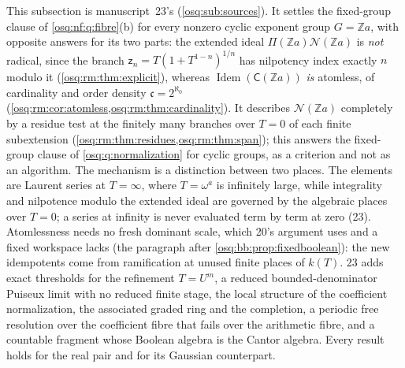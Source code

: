 \documentclass[11pt,letterpaper]{article}
\numberwithin{equation}{section}
\theoremstyle{definition}
\theoremstyle{remark}
\theoremstyle{plain}
\newcommand{\Z}{\mathbb Z}
\newcommand{\NN}{\mathcal N}         %
\newcommand{\Idem}{\operatorname{Idem}}
\begin{document}
This subsection is manuscript~23's (\cref{osq:sub:sources}). It settles the fixed-group clause of \cref{osq:nf:q:fibre}(b) for every nonzero
cyclic exponent group $G=\Z a$, with opposite answers for its two parts: the extended ideal $\Pi(\Z a)\NN(\Z a)$ is \emph{not} radical, since
the branch $\mathsf z_n=T(1+T^{1-n})^{1/n}$ has nilpotency index exactly $n$ modulo it (\cref{osq:rm:thm:explicit}), whereas $\Idem(\mathsf C(\Z a))$
\emph{is} atomless, of cardinality and order density $\mathfrak c=2^{\aleph_0}$ (\cref{osq:rm:cor:atomless,osq:rm:thm:cardinality}). It describes
$\NN(\Z a)$ completely by a residue test at the finitely many branches over $T=0$ of each finite subextension
(\cref{osq:rm:thm:residues,osq:rm:thm:span}); this answers the fixed-group clause of \cref{osq:q:normalization} for cyclic groups, as a criterion and
not as an algorithm. The mechanism is a distinction between two places. The elements are Laurent series at $T=\infty$, where $T=\omega^a$ is
infinitely large, while integrality and nilpotence modulo the extended ideal are governed by the algebraic places over $T=0$; a series at
infinity is never evaluated term by term at zero (23). Atomlessness needs no fresh dominant scale, which 20's argument uses and a fixed
workspace lacks (the paragraph after \cref{osq:bb:prop:fixedboolean}): the new idempotents come from ramification at unused finite places of
$k(T)$. 23 adds exact thresholds for the refinement $T=U^m$, a reduced bounded-denominator Puiseux limit with no reduced finite stage, the local
structure of the coefficient normalization, the associated graded ring and the completion, a periodic free resolution over the coefficient
fibre that fails over the arithmetic fibre, and a countable fragment whose Boolean algebra is the Cantor algebra. Every result holds for the
real pair and for its Gaussian counterpart.
\end{document}

